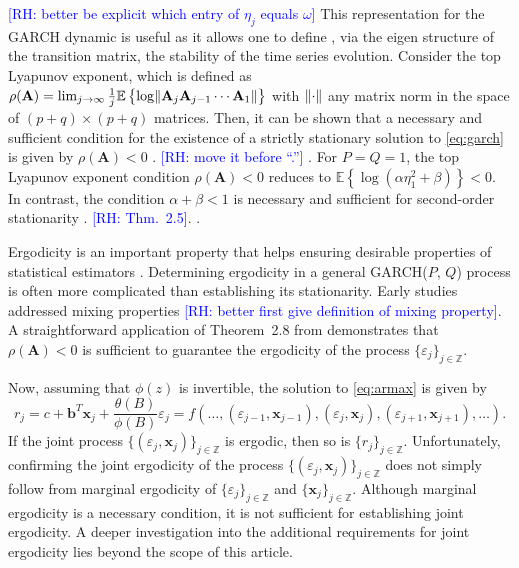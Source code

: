 \documentclass[10pt,a4paper,oneside]{article}
\newcommand{\Z}{\mathbb{Z}}
\newcommand{\E}{\mathbb{E}}
\newcommand{\rh}[1]{\textcolor{blue}{\textsf{[RH: #1]}}}
\DeclarePairedDelimiter{\norma}{\lVert}{\rVert} %
\providecommand{\DIFaddtex}[1]{{\protect\color{blue} \sf #1}} %
\providecommand{\DIFdeltex}[1]{{\protect\color{red} \scriptsize #1}} %
\providecommand{\DIFaddbegin}{} %
\providecommand{\DIFaddend}{} %
\providecommand{\DIFdelbegin}{} %
\providecommand{\DIFdelend}{} %
\providecommand{\DIFadd}[1]{\texorpdfstring{\DIFaddtex{#1}}{#1}} %
\providecommand{\DIFdel}[1]{\texorpdfstring{\DIFdeltex{#1}}{}} %
\newcommand{\DIFscaledelfig}{0.5}
\newlength{\DIFdelgraphicswidth} %
\newlength{\DIFdelgraphicsheight} %
\newcommand{\DIFaddincludegraphics}[2][]{{\color{blue}\fbox{\DIFOincludegraphics[#1]{#2}}}} %
\newcommand{\DIFdelincludegraphics}[2][]{%
\sbox{\DIFdelgraphicsbox}{\DIFOincludegraphics[#1]{#2}}%
\settoboxwidth{\DIFdelgraphicswidth}{\DIFdelgraphicsbox} %
\settoboxtotalheight{\DIFdelgraphicsheight}{\DIFdelgraphicsbox} %
\scalebox{\DIFscaledelfig}{%
\parbox[b]{\DIFdelgraphicswidth}{\usebox{\DIFdelgraphicsbox}\\[-\baselineskip] \rule{\DIFdelgraphicswidth}{0em}}\llap{\resizebox{\DIFdelgraphicswidth}{\DIFdelgraphicsheight}{%
\setlength{\unitlength}{\DIFdelgraphicswidth}%
\begin{picture}(1,1)%
\thicklines\linethickness{2pt} %
{\color[rgb]{1,0,0}\put(0,0){\framebox(1,1){}}}%
{\color[rgb]{1,0,0}\put(0,0){\line( 1,1){1}}}%
{\color[rgb]{1,0,0}\put(0,1){\line(1,-1){1}}}%
\end{picture}%
}\hspace*{3pt}}} %
} %
\DeclareRobustCommand{\DIFaddbegin}{\DIFOaddbegin \let\includegraphics\DIFaddincludegraphics} %
\DeclareRobustCommand{\DIFaddend}{\DIFOaddend \let\includegraphics\DIFOincludegraphics} %
\DeclareRobustCommand{\DIFdelbegin}{\DIFOdelbegin \let\includegraphics\DIFdelincludegraphics} %
\DeclareRobustCommand{\DIFdelend}{\DIFOaddend \let\includegraphics\DIFOincludegraphics} %
\begin{document}
 \DIFdelbegin \DIFdel{\rh{better be explicit which entry of $\eta_j$ equals $\omega$}
}\DIFdelend This representation for the GARCH dynamic is useful as it allows one to define \DIFdelbegin \DIFdel{, }\DIFdelend via the eigen structure of the transition matrix, the stability of the time series evolution. Consider the top Lyapunov exponent, which is defined as $\rho(\mathbf{A}) = \lim_{j \rightarrow \infty} \frac{1}{j} \E \left \{  \log\norma{\mathbf{A}_j \mathbf{A}_{j - 1} \cdots \mathbf{A}_1} \right \}$ with $\norma{\cdot}$ any matrix norm in the space of $(p + q) \times (p + q)$ matrices. Then, it can be shown that a necessary and sufficient condition for the existence of a strictly stationary solution to \eqref{eq:garch} is given by $\rho(\mathbf{A}) < 0$ \DIFdelbegin \DIFdel{. \citep[thm.~2.4.]{francq2019garch}\rh{move it before ``.''}}\DIFdelend \DIFaddbegin \DIFadd{\citep[thm.~2.4.]{francq2019garch}}\DIFaddend . For $P = Q = 1$, the top Lyapunov exponent condition $\rho(\mathbf{A}) < 0$ reduces to $\E \left\{ \log \left( \alpha \eta_1^2 + \beta \right) \right\} < 0$. In contrast, the condition $\alpha + \beta < 1$ is necessary and sufficient for second-order stationarity \DIFdelbegin \DIFdel{. \citep[thm.~2.5]{francq2019garch} \rh{Thm.~2.5}.
}\DIFdelend \DIFaddbegin \DIFadd{\citep[thm.~2.5.]{francq2019garch}.
}\DIFaddend 

Ergodicity is an important property that helps ensuring desirable properties of statistical estimators \citep[see~p.~367]{francq2019garch}. Determining ergodicity in a general GARCH(\(P\), \(Q\)) process is often more complicated than establishing its stationarity. Early studies addressed mixing properties \cite{boussama1998ergodicite, carrasco2002mixing}\DIFdelbegin \DIFdel{\rh{better first give definition of mixing property}}\DIFdelend . A straightforward application of Theorem~2.8 from \cite{straumann_quasi-maximum-likelihood_2006} demonstrates that \(\rho(\mathbf{A}) < 0\) is sufficient to guarantee the ergodicity of the process \(\{\varepsilon_j\}_{j \in \mathbb{Z}}\).

Now, assuming that $\phi(z)$ is invertible, the solution to \eqref{eq:armax} is given by
$$
    r_j = c +  \mathbf{b}^T \mathbf{x}_j + \frac{\theta(B)}{\phi(B)} \varepsilon_j = f(\dots, (\varepsilon_{j - 1}, \mathbf{x}_{j - 1}), (\varepsilon_{j}, \mathbf{x}_{j}), (\varepsilon_{j + 1}, \mathbf{x}_{j + 1}), \dots).
$$
If the joint process $\{ (\varepsilon_j, \mathbf{x}_j) \}_{j \in \Z}$ is ergodic, then so is $\{ r_j \}_{j \in \Z}$. Unfortunately, confirming the joint ergodicity of the process \(\{(\varepsilon_j, \mathbf{x}_j)\}_{j \in \mathbb{Z}}\) does not simply follow from marginal ergodicity of \(\{\varepsilon_j\}_{j \in \mathbb{Z}}\) and \(\{\mathbf{x}_j\}_{j \in \mathbb{Z}}\). Although marginal ergodicity is a necessary condition, it is not sufficient for establishing joint ergodicity. A deeper investigation into the additional requirements for joint ergodicity lies beyond the scope of this article.
\end{document}
